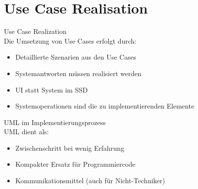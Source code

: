 \section{Use Case Realisation}

\begin{concept}{Use Case Realization}\\
Die Umsetzung von Use Cases erfolgt durch:
\begin{itemize}
    \item Detaillierte Szenarien aus den Use Cases
    \item Systemantworten müssen realisiert werden
    \item UI statt System im SSD
    \item Systemoperationen sind die zu implementierenden Elemente
\end{itemize}
\end{concept}

\begin{definition}{UML im Implementierungsprozess}\\
UML dient als:
\begin{itemize}
    \item Zwischenschritt bei wenig Erfahrung
    \item Kompakter Ersatz für Programmiercode
    \item Kommunikationsmittel (auch für Nicht-Techniker)
\end{itemize}
\end{definition}

